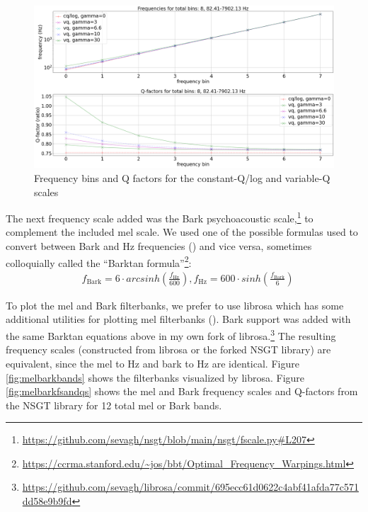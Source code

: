 \documentclass[report.tex]{subfiles}
\begin{document}
\begin{figure}[ht]
	\centering
	\includegraphics[width=\textwidth]{./images-freqscales/vqlog.png}
	\caption{Frequency bins and Q factors for the constant-Q/log and variable-Q scales}
	\label{fig:vq}
\end{figure}

The next frequency scale added was the Bark psychoacoustic scale,\footnote{\url{https://github.com/sevagh/nsgt/blob/main/nsgt/fscale.py\#L207}} to complement the included mel scale. We used one of the possible formulas used to convert between Bark and Hz frequencies (\cite{barktan}) and vice versa, sometimes colloquially called the ``Barktan formula''\footnote{\url{https://ccrma.stanford.edu/~jos/bbt/Optimal_Frequency_Warpings.html}}:
\begin{align}
	\nonumber & f_{\text{Bark}} = 6 \cdot arcsinh(\frac{f_{\text{Hz}}}{600}), f_{\text{Hz}} = 600 \cdot sinh(\frac{f_{\text{Bark}}}{6})
\end{align}

To plot the mel and Bark filterbanks, we prefer to use librosa which has some additional utilities for plotting mel filterbanks (\cite{librosa}). Bark support was added with the same Barktan equations above in my own fork of librosa.\footnote{\url{https://github.com/sevagh/librosa/commit/695ecc61d0622c4abf41afda77c571dd58e9b9fd}} The resulting frequency scales (constructed from librosa or the forked NSGT library) are equivalent, since the mel to Hz and bark to Hz are identical. Figure \ref{fig:melbarkbands} shows the filterbanks visualized by librosa. Figure \ref{fig:melbarkfsandqs} shows the mel and Bark frequency scales and Q-factors from the NSGT library for 12 total mel or Bark bands.
\end{document}
